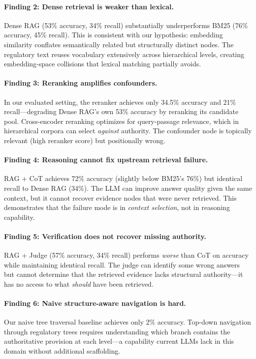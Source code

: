 \documentclass[11pt]{article}
\begin{document}
\paragraph{Finding 2: Dense retrieval is weaker than lexical.} Dense RAG (53\% accuracy, 34\% recall) substantially underperforms BM25 (76\% accuracy, 45\% recall). This is consistent with our hypothesis: embedding similarity conflates semantically related but structurally distinct nodes. The regulatory text reuses vocabulary extensively across hierarchical levels, creating embedding-space collisions that lexical matching partially avoids.

\paragraph{Finding 3: Reranking amplifies confounders.} In our evaluated setting, the reranker achieves only 34.5\% accuracy and 21\% recall---degrading Dense RAG's own 53\% accuracy by reranking its candidate pool. Cross-encoder reranking optimizes for query-passage relevance, which in hierarchical corpora can select \emph{against} authority. The confounder node is topically relevant (high reranker score) but positionally wrong.

\paragraph{Finding 4: Reasoning cannot fix upstream retrieval failure.} RAG + CoT achieves 72\% accuracy (slightly below BM25's 76\%) but identical recall to Dense RAG (34\%). The LLM can improve answer quality given the same context, but it cannot recover evidence nodes that were never retrieved. This demonstrates that the failure mode is in \emph{context selection}, not in reasoning capability.

\paragraph{Finding 5: Verification does not recover missing authority.} RAG + Judge (57\% accuracy, 34\% recall) performs \emph{worse} than CoT on accuracy while maintaining identical recall. The judge can identify some wrong answers but cannot determine that the retrieved evidence lacks structural authority---it has no access to what \emph{should} have been retrieved.

\paragraph{Finding 6: Naive structure-aware navigation is hard.} Our naive tree traversal baseline achieves only 2\% accuracy. Top-down navigation through regulatory trees requires understanding which branch contains the authoritative provision at each level---a capability current LLMs lack in this domain without additional scaffolding.
\end{document}
